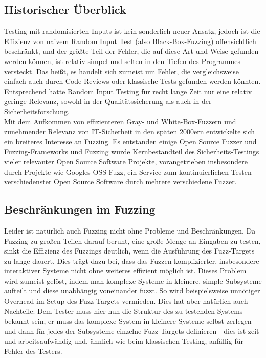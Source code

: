 \documentclass[a4paper]{article}
\begin{document}
\subsection{Historischer Überblick}
Testing mit randomisierten Inputs ist kein sonderlich neuer Ansatz\cite{randominput}, jedoch ist die Effizienz von naivem Random Input Test (also Black-Box-Fuzzing) offensichtlich beschränkt, und der größte Teil der Fehler, die auf diese Art und Weise gefunden werden können, ist relativ simpel und selten in den Tiefen des Programmes versteckt. 
Das heißt, es handelt sich zumeist um Fehler, die vergleichsweise einfach auch durch Code-Reviews oder klassische Tests gefunden werden könnten. 
Entsprechend hatte Random Input Testing für recht lange Zeit nur eine relativ geringe Relevanz, sowohl in der Qualitätssicherung als auch in der Sicherheitsforschung.\\
Mit dem Aufkommen von effizienteren Gray- und White-Box-Fuzzern und zunehmender Relevanz von IT-Sicherheit in den späten 2000ern entwickelte sich ein breiteres Interesse an Fuzzing\cite{fuzzinghistory}. Es entstanden einige Open Source Fuzzer und Fuzzing-Frameworks und Fuzzing wurde Kernbestandteil des Sicherheits-Testings vieler relevanter Open Source Software Projekte, vorangetrieben insbesondere durch Projekte wie Googles OSS-Fuzz, ein Service zum kontinuierlichen Testen verschiedenster Open Source Software durch mehrere verschiedene Fuzzer.

\subsection{Beschränkungen im Fuzzing}
Leider ist natürlich auch Fuzzing nicht ohne Probleme und Beschränkungen. 
Da Fuzzing zu großen Teilen darauf beruht, eine große Menge an Eingaben zu testen, sinkt die Effizienz des Fuzzings deutlich, wenn die Ausführung des Fuzz-Targets zu lange dauert. 
Dies trägt dazu bei, dass das Fuzzen komplizierter, insbesondere interaktiver Systeme nicht ohne weiteres effizient möglich ist. 
Dieses Problem wird zumeist gelöst, indem man komplexe Systeme in kleinere, simple Subsysteme aufteilt und diese unabhängig voneinander fuzzt. So wird beispielsweise unnötiger Overhead im Setup des Fuzz-Targets vermieden. 
Dies hat aber natürlich auch Nachteile: Dem Tester muss hier nun die Struktur des zu testenden Systems bekannt sein, er muss das komplexe System in kleinere Systeme selbst zerlegen und dann für jedes der Subsysteme einzelne Fuzz-Targets definieren - dies ist zeit- und arbeitsaufwändig und, ähnlich wie beim klassischen Testing, anfällig für Fehler des Testers. 
\end{document}
